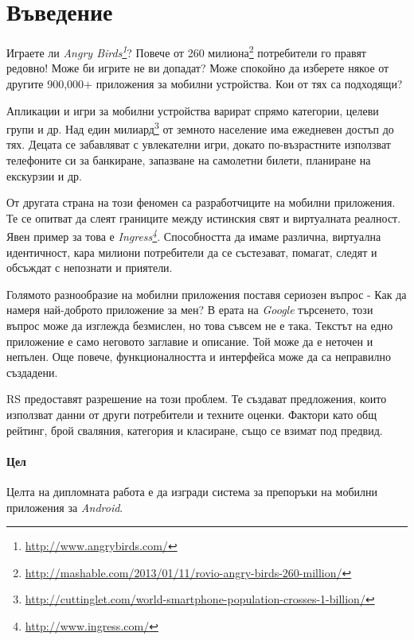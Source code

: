 \chapter*{Въведение}

	Играете ли \emph{Angry Birds\footnote{\url{http://www.angrybirds.com/}}}? Повече от 260 милиона\footnote{\url{http://mashable.com/2013/01/11/rovio-angry-birds-260-million/}} потребители го правят редовно! Може би игрите не ви допадат? Може спокойно да изберете някое от другите 900,000$+$ приложения за мобилни устройства. Кои от тях са подходящи?
	
	Апликации и игри за мобилни устройства варират спрямо категории, целеви групи и др. Над един милиард\footnote{\url{http://cuttinglet.com/world-smartphone-population-crosses-1-billion/}} от земното население има ежедневен достъп до тях. Децата се забавляват с увлекателни игри, докато по-възрастните използват телефоните си за банкиране, запазване на самолетни билети, планиране на екскурзии и др.
	
	От другата страна на този феномен са разработчиците на мобилни приложения. Те се опитват да слеят границите между истинския свят и виртуалната реалност. Явен пример за това е \emph{Ingress\footnote{\url{http://www.ingress.com/}}}. Способността да имаме различна, виртуална идентичност, кара милиони потребители да се състезават, помагат, следят и обсъждат с непознати и приятели.
	
	Голямото разнообразие на мобилни приложения поставя сериозен въпрос - Как да намеря най-доброто приложение за мен? В ерата на \emph{Google} търсенето, този въпрос може да изглежда безмислен, но това съвсем не е така. Текстът на едно приложение е само неговото заглавие и описание. Той може да е неточен и непълен. Още повече, функционалността и интерфейса може да са неправилно създадени.
	
	\ac{RS} предоставят разрешение на този проблем. Те създават предложения, които използват данни от други потребители и техните оценки. Фактори като общ рейтинг, брой сваляния, категория и класиране, също се взимат под предвид.

	\subsubsection{Цел}
	
		Целта на дипломната работа е да изгради система за препоръки на мобилни приложения за \emph{Android}.

